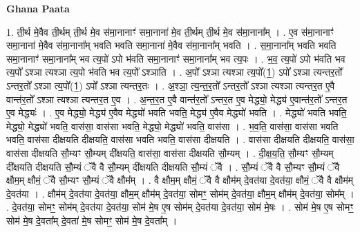 \documentclass[17pt]{extarticle}
\begin{document}
\textbf{Ghana Paata } \newline

1. ती॒र्थ मे॒वैव ती॒र्थम् ती॒र्थ मे॒व स॑मा॒नानाꣳ॑ समा॒नाना॑ मे॒व ती॒र्थम् ती॒र्थ मे॒व स॑मा॒नाना᳚म् । . ए॒व स॑मा॒नानाꣳ॑ समा॒नाना॑ मे॒वैव स॑मा॒नाना᳚म् भवति भवति समा॒नाना॑ मे॒वैव स॑मा॒नाना᳚म् भवति । . स॒मा॒नाना᳚म् भवति भवति समा॒नानाꣳ॑ समा॒नाना᳚म् भव त्य॒पो॑ ऽपो भ॑वति समा॒नानाꣳ॑ समा॒नाना᳚म् भव त्य॒पः । . भ॒व॒ त्य॒पो॑ ऽपो भ॑वति भव त्य॒पो᳚ ऽश्ञा त्यश्ञा त्य॒पो भ॑वति भव त्य॒पो᳚ ऽश्ञाति । . अ॒पो᳚ ऽश्ञा त्यश्ञा त्य॒पो᳚(1॒) ऽपो᳚ ऽश्ञा त्यन्तर॒तो᳚ ऽन्तर॒तो᳚ ऽश्ञा त्य॒पो᳚(1॒) ऽपो᳚ ऽश्ञा त्यन्तर॒तः । . अ॒श्ञा॒ त्य॒न्त॒र॒तो᳚ ऽन्तर॒तो᳚ ऽश्ञा त्यश्ञा त्यन्तर॒त ए॒वै वान्त॑र॒तो᳚ ऽश्ञा त्यश्ञा त्यन्तर॒त ए॒व । . अ॒न्त॒र॒त ए॒वै वान्त॑र॒तो᳚ ऽन्तर॒त ए॒व मेद्ध्यो॒ मेद्ध्य॑ ए॒वान्त॑र॒तो᳚ ऽन्तर॒त ए॒व मेद्ध्यः॑ । . ए॒व मेद्ध्यो॒ मेद्ध्य॑ ए॒वैव मेद्ध्यो॑ भवति भवति॒ मेद्ध्य॑ ए॒वैव मेद्ध्यो॑ भवति । . मेद्ध्यो॑ भवति भवति॒ मेद्ध्यो॒ मेद्ध्यो॑ भवति॒ वास॑सा॒ वास॑सा भवति॒ मेद्ध्यो॒ मेद्ध्यो॑ भवति॒ वास॑सा । . भ॒व॒ति॒ वास॑सा॒ वास॑सा भवति भवति॒ वास॑सा दीक्षयति दीक्षयति॒ वास॑सा भवति भवति॒ वास॑सा दीक्षयति । . वास॑सा दीक्षयति दीक्षयति॒ वास॑सा॒ वास॑सा दीक्षयति सौ॒म्यꣳ सौ॒म्यम् दी᳚क्षयति॒ वास॑सा॒ वास॑सा दीक्षयति सौ॒म्यम् । . दी॒क्ष॒य॒ति॒ सौ॒म्यꣳ सौ॒म्यम् दी᳚क्षयति दीक्षयति सौ॒म्यं ॅवै वै सौ॒म्यम् दी᳚क्षयति दीक्षयति सौ॒म्यं ॅवै । . सौ॒म्यं ॅवै वै सौ॒म्यꣳ सौ॒म्यं ॅवै क्षौम॒म् क्षौमं॒ ॅवै सौ॒म्यꣳ सौ॒म्यं ॅवै क्षौम᳚म् । . वै क्षौम॒म् क्षौमं॒ ॅवै वै क्षौम॑म् दे॒वत॑या दे॒वत॑या॒ क्षौमं॒ ॅवै वै क्षौम॑म् दे॒वत॑या । . क्षौम॑म् दे॒वत॑या दे॒वत॑या॒ क्षौम॒म् क्षौम॑म् दे॒वत॑या॒ सोमꣳ॒॒ सोम॑म् दे॒वत॑या॒ क्षौम॒म् क्षौम॑म् दे॒वत॑या॒ सोम᳚म् । . दे॒वत॑या॒ सोमꣳ॒॒ सोम॑म् दे॒वत॑या दे॒वत॑या॒ सोम॑ मे॒ष ए॒ष सोम॑म् दे॒वत॑या दे॒वत॑या॒ सोम॑ मे॒षः । . सोम॑ मे॒ष ए॒ष सोमꣳ॒॒ सोम॑ मे॒ष दे॒वता᳚म् दे॒वता॑ मे॒ष सोमꣳ॒॒ सोम॑ मे॒ष दे॒वता᳚म् । \newline
\end{document}
